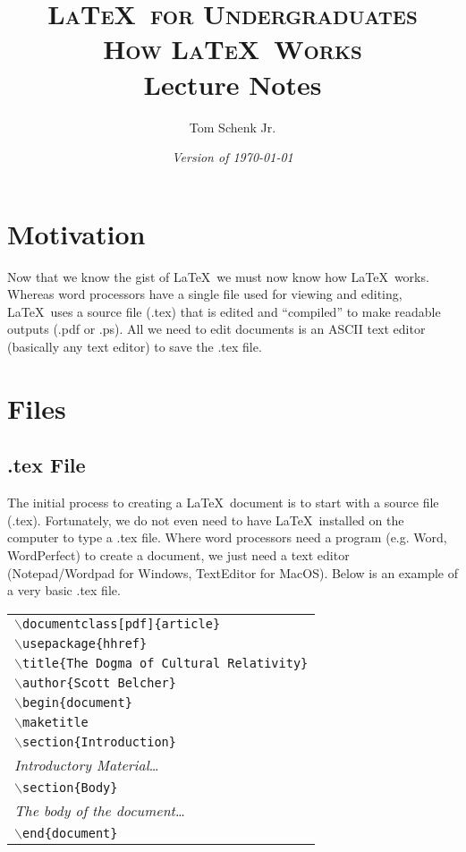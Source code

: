 \documentclass{article}
\title{\textsc{\LaTeX\ for Undergraduates\\
			How \LaTeX\ Works} \\
			Lecture Notes}
\author{Tom Schenk Jr.}		%
\date{\textit{Version of \today}}
\begin{document}
\maketitle

\section{Motivation}

Now that we know the gist of \LaTeX\, we must now know how \LaTeX\ works. Whereas word processors have a single file used for viewing and editing, \LaTeX\ uses a source file (.tex) that is edited and ``compiled'' to make readable outputs (.pdf or .ps). All we need to edit documents is an ASCII text editor (basically any text editor) to save the .tex file.

\section{Files}

\subsection{.tex File}

The initial process to creating a \LaTeX\ document is to start with a source file (.tex). Fortunately, we do not even need to have \LaTeX\ installed on the computer to type a .tex file. Where word processors need a program (e.g. Word, WordPerfect) to create a document, we just need a text editor (Notepad/Wordpad for Windows, TextEditor for MacOS). Below is an example of a very basic .tex file.
\begin{center}
\begin{tabular}{l}
\texttt{$\backslash$documentclass[pdf]\{article\}} \\
\texttt{$\backslash$usepackage\{hhref\}} \\
\texttt{$\backslash$title\{The Dogma of Cultural Relativity\}} \\
\texttt{$\backslash$author\{Scott Belcher\}} \\
\texttt{$\backslash$begin\{document\}} \\
\texttt{$\backslash$maketitle} \\
\texttt{$\backslash$section\{Introduction\}} \\
\textit{Introductory Material}\ldots \\
\texttt{$\backslash$section\{Body\}} \\
\textit{The body of the document}\ldots \\
\texttt{$\backslash$end\{document\}} \\
\end{tabular}
\end{center}
\end{document}
